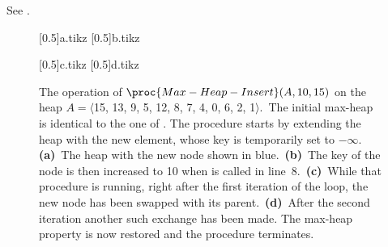 See .
\begin{figure}[htb]
    \captionsetup[subfigure]{}
    \subcaptionbox{\label{fig:6.5-2a}}[0.5\textwidth]{{a.tikz}}
    \subcaptionbox{\label{fig:6.5-2b}}[0.5\textwidth]{{b.tikz}}
    \par\vspace{4ex}
    \subcaptionbox{\label{fig:6.5-2c}}[0.5\textwidth]{{c.tikz}}
    \subcaptionbox{\label{fig:6.5-2d}}[0.5\textwidth]{{d.tikz}}
    \caption{The operation of $\proc{Max-Heap-Insert}(A,10,15)$ on the heap $A=\langle$15, 13, 9, 5, 12, 8, 7, 4, 0, 6, 2, 1$\rangle$.\,
    The initial max-heap is identical to the one of .
    The procedure starts by extending the heap with the new element, whose key is temporarily set to $-\infty$.
    \textbf{(a)}\, The heap with the new node shown in blue.\,
    \textbf{(b)}\, The key of the node is then increased to 10 when  is called in line~8.\,
    \textbf{(c)}\, While that procedure is running, right after the first iteration of the  loop, the new node has been swapped with its parent.\,
    \textbf{(d)}\, After the second iteration another such exchange has been made.
    The max-heap property is now restored and the procedure terminates.} \label{fig:6.5-2}
\end{figure}
